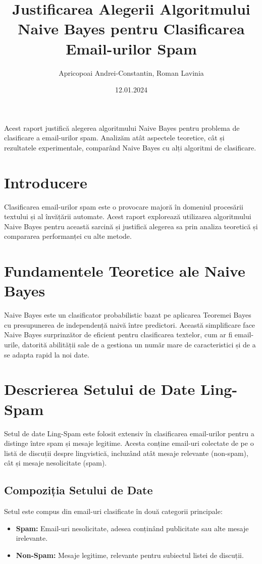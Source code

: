 \documentclass{article}
\title{Justificarea Alegerii Algoritmului Naive Bayes pentru Clasificarea Email-urilor Spam}
\author{Apricopoai Andrei-Constantin, Roman Lavinia}
\date{12.01.2024}
\begin{document}
\maketitle

Acest raport justifică alegerea algoritmului Naive Bayes pentru problema de clasificare a email-urilor spam. Analizăm atât aspectele teoretice, cât și rezultatele experimentale, comparând Naive Bayes cu alți algoritmi de clasificare.

\section{Introducere}
Clasificarea email-urilor spam este o provocare majoră în domeniul procesării textului și al învățării automate. Acest raport explorează utilizarea algoritmului Naive Bayes pentru această sarcină și justifică alegerea sa prin analiza teoretică și compararea performanței cu alte metode.

\section{Fundamentele Teoretice ale Naive Bayes}
Naive Bayes este un clasificator probabilistic bazat pe aplicarea Teoremei Bayes cu presupunerea de independență naivă între predictori. Această simplificare face Naive Bayes surprinzător de eficient pentru clasificarea textelor, cum ar fi email-urile, datorită abilității sale de a gestiona un număr mare de caracteristici și de a se adapta rapid la noi date.


\section{Descrierea Setului de Date Ling-Spam}

Setul de date Ling-Spam este folosit extensiv în clasificarea email-urilor pentru a distinge între spam și mesaje legitime. Acesta conține email-uri colectate de pe o listă de discuții despre lingvistică, incluzând atât mesaje relevante (non-spam), cât și mesaje nesolicitate (spam).

\subsection{Compoziția Setului de Date}

Setul este compus din email-uri clasificate în două categorii principale: 
\begin{itemize}
    \item \textbf{Spam:} Email-uri nesolicitate, adesea conținând publicitate sau alte mesaje irelevante.
    \item \textbf{Non-Spam:} Mesaje legitime, relevante pentru subiectul listei de discuții.
\end{itemize}
\end{document}
